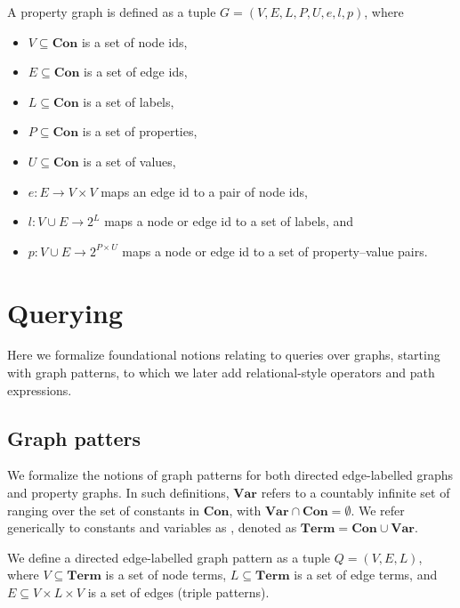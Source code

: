 \begin{definition}\label{def:property-graph}
    A property graph is defined as a tuple $G = (V, E, L, P, U, e, l, p)$, where
    \begin{itemize}
        \item $V \subseteq \textbf{Con}$ is a set of node ids,
        \item $E \subseteq \textbf{Con}$ is a set of edge ids,
        \item $L \subseteq \textbf{Con}$ is a set of labels,
        \item $P \subseteq \textbf{Con}$ is a set of properties,
        \item $U \subseteq \textbf{Con}$ is a set of values,
        \item $e : E \to V \times V$ maps an edge id to a pair of node ids,
        \item $l : V \cup E \to 2^L$ maps a node or edge id to a set of labels, and
        \item $p : V \cup E \to 2^{P \times U}$ maps a node or edge id to a set of property–value pairs.
    \end{itemize}
    \end{definition}

\section{Querying}
Here we formalize foundational notions relating to queries over graphs, starting with graph patterns, to which we later add relational-style operators and path expressions.

\subsection{Graph patters}
We formalize the notions of graph patterns for both directed edge-labelled graphs and property graphs. In such definitions, $\textbf{Var}$ refers to a countably infinite set of  ranging over the set of constants in $\textbf{Con}$, with $\textbf{Var}\cap\textbf{Con}=\emptyset$. We refer generically to constants and variables as , denoted as $\textbf{Term} = \textbf{Con} \cup \textbf{Var}$. 

\begin{definition}\label{def:directed-edge-labelled-graph-pattern}
    We define a directed edge-labelled graph pattern as a tuple $Q = (V, E, L)$, where $V \subseteq \textbf{Term}$ is a set of node terms, $L \subseteq \textbf{Term}$ is a set of edge terms, and $E \subseteq V \times L \times V$ is a set of edges (triple patterns).
\end{definition}

